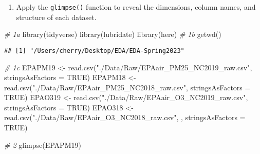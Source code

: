 \documentclass[
]{article}
\newenvironment{Shaded}{\begin{snugshade}}{\end{snugshade}}
\newcommand{\AttributeTok}[1]{\textcolor[rgb]{0.77,0.63,0.00}{#1}}
\newcommand{\CommentTok}[1]{\textcolor[rgb]{0.56,0.35,0.01}{\textit{#1}}}
\newcommand{\ConstantTok}[1]{\textcolor[rgb]{0.00,0.00,0.00}{#1}}
\newcommand{\FunctionTok}[1]{\textcolor[rgb]{0.00,0.00,0.00}{#1}}
\newcommand{\NormalTok}[1]{#1}
\newcommand{\OtherTok}[1]{\textcolor[rgb]{0.56,0.35,0.01}{#1}}
\newcommand{\StringTok}[1]{\textcolor[rgb]{0.31,0.60,0.02}{#1}}
\providecommand{\tightlist}{%
  \setlength{\itemsep}{0pt}\setlength{\parskip}{0pt}}
\begin{document}
\begin{enumerate}
\def\labelenumi{\arabic{enumi}.}
\setcounter{enumi}{1}
\tightlist
\item
  Apply the \texttt{glimpse()} function to reveal the dimensions, column
  names, and structure of each dataset.
\end{enumerate}

\begin{Shaded}
\begin{Highlighting}[]
\CommentTok{\# 1a}
\FunctionTok{library}\NormalTok{(tidyverse)}
\FunctionTok{library}\NormalTok{(lubridate)}
\FunctionTok{library}\NormalTok{(here)}
\CommentTok{\# 1b}
\FunctionTok{getwd}\NormalTok{()}
\end{Highlighting}
\end{Shaded}

\begin{verbatim}
## [1] "/Users/cherry/Desktop/EDA/EDA-Spring2023"
\end{verbatim}

\begin{Shaded}
\begin{Highlighting}[]
\CommentTok{\# 1c}
\NormalTok{EPAPM19 }\OtherTok{\textless{}{-}} \FunctionTok{read.csv}\NormalTok{(}\StringTok{"./Data/Raw/EPAair\_PM25\_NC2019\_raw.csv"}\NormalTok{, }\AttributeTok{stringsAsFactors =} \ConstantTok{TRUE}\NormalTok{)}
\NormalTok{EPAPM18 }\OtherTok{\textless{}{-}} \FunctionTok{read.csv}\NormalTok{(}\StringTok{"./Data/Raw/EPAair\_PM25\_NC2018\_raw.csv"}\NormalTok{, }\AttributeTok{stringsAsFactors =} \ConstantTok{TRUE}\NormalTok{)}
\NormalTok{EPAO319 }\OtherTok{\textless{}{-}} \FunctionTok{read.csv}\NormalTok{(}\StringTok{"./Data/Raw/EPAair\_O3\_NC2019\_raw.csv"}\NormalTok{, }\AttributeTok{stringsAsFactors =} \ConstantTok{TRUE}\NormalTok{)}
\NormalTok{EPAO318 }\OtherTok{\textless{}{-}} \FunctionTok{read.csv}\NormalTok{(}\StringTok{"./Data/Raw/EPAair\_O3\_NC2018\_raw.csv"}\NormalTok{, , }\AttributeTok{stringsAsFactors =} \ConstantTok{TRUE}\NormalTok{)}

\CommentTok{\# 2}
\FunctionTok{glimpse}\NormalTok{(EPAPM19)}
\end{Highlighting}
\end{Shaded}
\end{document}
